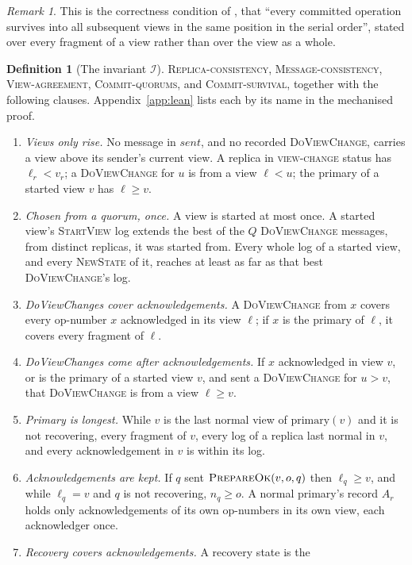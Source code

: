 \documentclass[11pt,a4paper]{article}
\theoremstyle{plain}
\theoremstyle{definition}
\newtheorem{definition}[theorem]{Definition}
\theoremstyle{remark}
\newtheorem{remark}[theorem]{Remark}
\newcommand{\msg}[1]{\textsc{#1}}
\newcommand{\dvc}{\msg{DoViewChange}}
\newcommand{\Inv}{\mathcal{I}}
\newcommand{\primary}{\mathrm{primary}}
\newcommand{\sent}{\mathit{sent}}
\newcommand{\viewchange}{\textsc{view-change}}
\newcommand{\Local}{\textsc{Replica-consistency}}
\newcommand{\WellFormed}{\textsc{Message-consistency}}
\newcommand{\OneLog}{\textsc{View-agreement}}
\newcommand{\CommitsBacked}{\textsc{Commit-quorums}}
\newcommand{\Survival}{\textsc{Commit-survival}}
\begin{document}
\begin{remark}
This is the correctness condition of \citet[\S8.1]{liskov2012vr}, that
``every committed operation survives into all subsequent views in the
same position in the serial order'', stated over every fragment of a
view rather than over the view as a whole.
\end{remark}

\begin{definition}[The invariant $\Inv$]
\label{def:inv}
\Local, \WellFormed, \OneLog, \CommitsBacked, and \Survival, together
with the following clauses. Appendix~\ref{app:lean} lists each by its
name in the mechanised proof.
\begin{enumerate}[nosep,label=(\alph*)]
  \item \emph{Views only rise.} No message in $\sent$, and no recorded
    \dvc{}, carries a view above its sender's current view. A replica in
    \viewchange{} status has $\ell_r < v_r$; a \dvc{} for $u$ is from a
    view $\ell < u$; the primary of a started view $v$ has $\ell \ge v$.
  \item \emph{Chosen from a quorum, once.} A view is started at most
    once. A started view's \msg{StartView} log extends the best of the
    $Q$ \dvc{} messages, from distinct replicas, it was started from.
    Every whole log of a started view, and every \msg{NewState} of it,
    reaches at least as far as that best \dvc{}'s log.
  \item \emph{DoViewChanges cover acknowledgements.} A \dvc{} from $x$
    covers every op-number $x$ acknowledged in its view $\ell$; if $x$ is
    the primary of $\ell$, it covers every fragment of $\ell$.
  \item \emph{DoViewChanges come after acknowledgements.} If $x$
    acknowledged in view $v$, or is the primary of a started view $v$,
    and sent a \dvc{} for $u > v$, that \dvc{} is from a view
    $\ell \ge v$.
  \item \emph{Primary is longest.} While $v$ is the last normal view of
    $\primary(v)$ and it is not recovering, every fragment of $v$, every
    log of a replica last normal in $v$, and every acknowledgement in
    $v$ is within its log.
  \item \emph{Acknowledgements are kept.} If $q$ sent
    $\msg{PrepareOk}(v, o, q)$ then $\ell_q \ge v$, and while
    $\ell_q = v$ and $q$ is not recovering, $n_q \ge o$. A normal
    primary's record $A_r$ holds only acknowledgements of its own
    op-numbers in its own view, each acknowledger once.
  \item \emph{Recovery covers acknowledgements.} A recovery state is the

\end{enumerate}
\end{definition}
\end{document}
